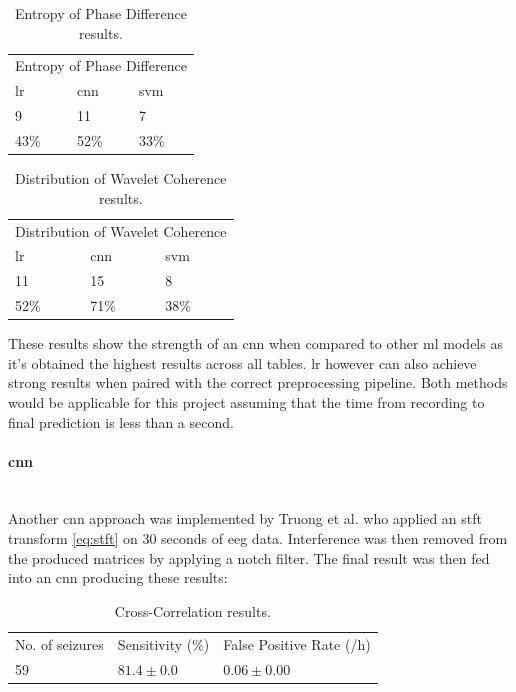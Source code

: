 \documentclass[12pt]{article}
\begin{document}
\begin{table}[H]
\centering
\begin{tabular}{lll}
\multicolumn{3}{l}{Entropy of Phase Difference} \\
\acrshort{lr}          & \acrshort{cnn}        & \acrshort{svm}        \\
9              & 11             & 7             \\
43\%           & 52\%           & 33\%         
\end{tabular}
\caption{Entropy of Phase Difference results. }
\end{table}

\begin{table}[H]
\centering
\begin{tabular}{lll}
\multicolumn{3}{l}{Distribution of Wavelet Coherence} \\
\acrshort{lr}          & \acrshort{cnn}        & \acrshort{svm}        \\
11               & 15               & 8               \\
52\%             & 71\%             & 38\%           
\end{tabular}
\caption{Distribution of Wavelet Coherence results.}
\end{table}


These results show the strength of an \acrshort{cnn} when compared to other \acrshort{ml} models as it's obtained the highest results across all tables. \acrshort{lr} however can also achieve strong results when paired with the correct preprocessing pipeline. Both methods would be applicable for this project assuming that the time from recording to final prediction is less than a second.

\paragraph{\acrfull{cnn}}\mbox{}\\

Another \acrshort{cnn} approach was implemented by Truong et al. \cite{truong2018convolutional} who applied an \acrfull{stft} transform \ref{eq:stft} on 30 seconds of \acrshort{eeg} data. Interference was then removed from the produced matrices by applying a notch filter. The final result was then fed into an \acrshort{cnn} producing these results:

\begin{table}[H]
\centering
\begin{tabular}{lll}
No. of seizures & Sensitivity (\%) & False Positive Rate (/h) \\
59              & $81.4 \pm 0.0$   & $0.06 \pm 0.00$         
\end{tabular}
\caption{Cross-Correlation results. }
\label{tab:my-table}
\end{table}
\end{document}
